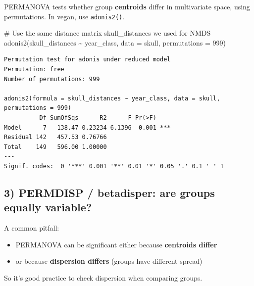 \documentclass[
  letterpaper,
  8pt,
  a4paper]{book}
\newenvironment{Shaded}{\begin{snugshade}}{\end{snugshade}}
\newcommand{\AttributeTok}[1]{\textcolor[rgb]{0.40,0.45,0.13}{#1}}
\newcommand{\CommentTok}[1]{\textcolor[rgb]{0.37,0.37,0.37}{#1}}
\newcommand{\DecValTok}[1]{\textcolor[rgb]{0.68,0.00,0.00}{#1}}
\newcommand{\FunctionTok}[1]{\textcolor[rgb]{0.28,0.35,0.67}{#1}}
\newcommand{\NormalTok}[1]{\textcolor[rgb]{0.00,0.23,0.31}{#1}}
\newcommand{\OtherTok}[1]{\textcolor[rgb]{0.00,0.23,0.31}{#1}}
\newcommand{\SpecialCharTok}[1]{\textcolor[rgb]{0.37,0.37,0.37}{#1}}
\providecommand{\tightlist}{%
  \setlength{\itemsep}{0pt}\setlength{\parskip}{0pt}}
\begin{document}
PERMANOVA tests whether group \textbf{centroids} differ in multivariate
space, using permutations. In vegan, use \texttt{adonis2()}.

\begin{Shaded}
\begin{Highlighting}[]
\CommentTok{\# Use the same distance matrix skull\_distances we used for NMDS}
\FunctionTok{adonis2}\NormalTok{(skull\_distances }\SpecialCharTok{\textasciitilde{}}\NormalTok{ year\_class, }\AttributeTok{data =}\NormalTok{ skull, }\AttributeTok{permutations =} \DecValTok{999}\NormalTok{)}
\end{Highlighting}
\end{Shaded}

\begin{verbatim}
Permutation test for adonis under reduced model
Permutation: free
Number of permutations: 999

adonis2(formula = skull_distances ~ year_class, data = skull, permutations = 999)
          Df SumOfSqs      R2      F Pr(>F)    
Model      7   138.47 0.23234 6.1396  0.001 ***
Residual 142   457.53 0.76766                  
Total    149   596.00 1.00000                  
---
Signif. codes:  0 '***' 0.001 '**' 0.01 '*' 0.05 '.' 0.1 ' ' 1
\end{verbatim}

\subsection*{3) PERMDISP / betadisper: are groups equally
variable?}\label{permdisp-betadisper-are-groups-equally-variable}

A common pitfall:

\begin{itemize}
\tightlist
\item
  PERMANOVA can be significant either because \textbf{centroids differ}
\item
  or because \textbf{dispersion differs} (groups have different spread)
\end{itemize}

So it's good practice to check dispersion when comparing groups.

\begin{Shaded}
\end{Shaded}
\end{document}
